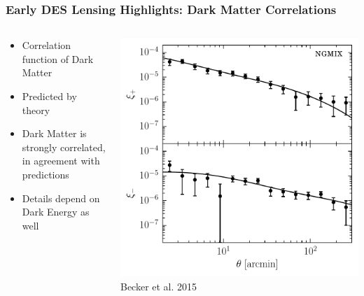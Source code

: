 \documentclass{beamer}
\begin{document}
\frame
{

    \frametitle{Early DES Lensing Highlights: Dark Matter Correlations}

 
    \begin{columns}
        \begin{column}{0.4\textwidth}
            \begin{itemize}

                \item Correlation function of Dark Matter
                
                \item Predicted by theory

                \item Dark Matter is strongly correlated, in agreement with predictions

                \item Details depend on Dark Energy as well

            \end{itemize}
        \end{column}
        \begin{column}{0.6\textwidth}
                \centering
                \includegraphics[width=\textwidth]{ngmix_xi.pdf}
                \newline
                {\tiny Becker et al. 2015}
        \end{column}
    \end{columns}

}
\end{document}

